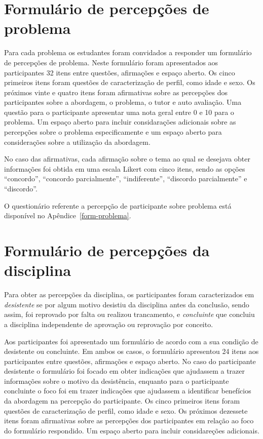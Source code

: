 \section{Formulário de percepções de problema}
\label{form-percepcoes}
Para cada problema os estudantes foram convidados a responder um formulário de percepções de problema.
Neste formulário foram apresentados aos participantes 32 itens entre questões, afirmações e espaço aberto.
Os cinco primeiros itens foram questões de caracterização de perfil, como
idade e sexo.
Os próximos vinte e quatro itens foram afirmativas sobre as percepções dos participantes sobre a abordagem, o
problema, o tutor e auto avaliação.
Uma questão para o participante apresentar uma nota geral entre 0 e 10 para o problema.
Um espaço aberto para incluir considarações adicionais sobre
as percepções sobre o problema especificamente e um espaço aberto para considerações
sobre a utilização da abordagem.

No caso das afirmativas, cada afirmação sobre o tema ao qual se desejava obter informações
foi obtida em uma escala Likert com cinco itens,
sendo as opções ``concordo'', ``concordo parcialmente'', ``indiferente'',
``discordo parcialmente'' e ``discordo''.

O questionário referente a percepção de participante sobre problema está disponível no
Apêndice~\ref{form-problema}.

\section{Formulário de percepções da disciplina}
\label{form-disciplinas}
Para obter as percepções da disciplina, os participantes foram caracterizados em \textit{desistente}
se por algum motivo desistiu da disciplina antes da conclusão, sendo assim, foi reprovado por
falta ou realizou trancamento, e \textit{concluinte} que concluiu a disciplina independente
de aprovação ou reprovação por conceito.

Aos participantes foi apresentado um formulário de acordo com a sua condição de desistente
ou concluinte.
Em ambos os casos, o formulário apresentou 24 itens aos participantes entre questões,
afirmações e espaço aberto.
No caso do participante desistente o formulário foi focado em obter indicações
que ajudassem a trazer informações sobre o motivo da desistência, enquanto para o participante concluinte
o foco foi em trazer indicações que ajudassem a identificar benefícios da abordagem na percepção
do participante.
Os cinco primeiros itens foram questões de caracterização de perfil, como
idade e sexo.
Os próximos dezessete itens foram afirmativas sobre as percepções dos participantes em
relação ao foco do formulário respondido.
Um espaço aberto para incluir considareções adicionais.

